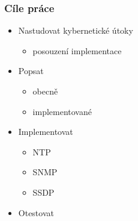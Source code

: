 \documentclass[%
  12pt,       				%
	t,                  %
	aspectratio=1610,   %
	unicode,						%
czech,              %
]{beamer}				    	%
\begin{document}
\vypninavigacnisymboly

\vytvortitulku


\begin{frame} 
	\frametitle{Cíle práce}
	\begin{itemize}
			\item Nastudovat kybernetické útoky
			\begin{itemize}
				\item posouzení implementace
			\end{itemize}
			\item Popsat
				\begin{itemize}
					\item obecně
					\item implementované
				\end{itemize}
			\item Implementovat
				\begin{itemize}
					\item NTP
					\item SNMP
					\item SSDP
				\end{itemize}
			\item Otestovat
	\end{itemize}
\end{frame}

\end{document}

